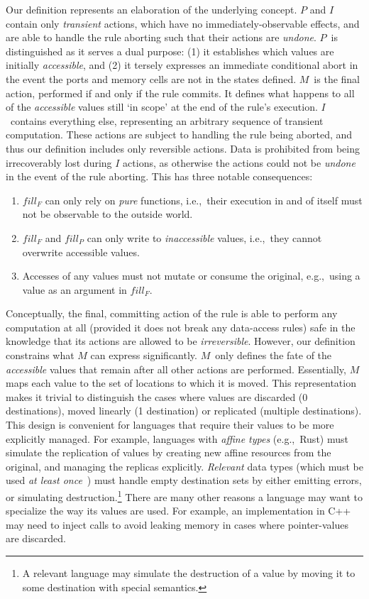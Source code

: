 Our definition represents an elaboration of the underlying concept. $P$ and $I$ contain only \textit{transient} actions, which have no immediately-observable effects, and are able to handle the rule aborting such that their actions are \textit{undone}. $P$~is distinguished as it serves a dual purpose: (1) it establishes which values are initially \textit{accessible}, and (2) it tersely expresses an immediate conditional abort in the event the ports and memory cells are not in the states defined. $M$~is the final action, performed if and only if the rule commits. It defines what happens to all of the \textit{accessible} values still `in scope' at the end of the rule's execution. $I$~contains everything else, representing an arbitrary sequence of transient computation. These actions are subject to handling the rule being aborted, and thus our definition includes only reversible actions. Data is prohibited from being irrecoverably lost during $I$ actions, as otherwise the actions could not be \textit{undone} in the event of the rule aborting. This has three notable consequences:
\begin{enumerate}
	\item $fill_F$ can only rely on \textit{pure} functions, i.e.,\ their execution in and of itself must not be observable to the outside world.
	\item $fill_F$ and $fill_P$ can only write to \textit{inaccessible} values, i.e.,\ they cannot overwrite accessible values.
	\item Accesses of any values must not mutate or consume the original, e.g.,\ using a value as an argument in $fill_F$.
\end{enumerate}

Conceptually, the final, committing action of the rule is able to perform any computation at all (provided it does not break any data-access rules) safe in the knowledge that its actions are allowed to be \textit{irreversible}. However, our definition constrains what $M$ can express significantly. $M$~only defines the fate of the \textit{accessible} values that remain after all other actions are performed. Essentially, $M$ maps each value to the set of locations to which it is moved. This representation makes it trivial to distinguish the cases where values are discarded (0 destinations), moved linearly (1 destination) or replicated (multiple destinations). This design is convenient for languages that require their values to be more explicitly managed. For example, languages with \textit{affine types} (e.g.,\ Rust) must simulate the replication of values by creating new affine resources from the original, and managing the replicas explicitly.  \textit{Relevant} data types (which must be used \textit{at least once}~\cite{walker2005substructural}) must handle empty destination sets by either emitting errors, or simulating destruction.\footnote{A relevant language may simulate the destruction of a value by moving it to some  destination with special semantics.} There are many other reasons a language may want to specialize the way its values are used. For example, an implementation in C++ may need to inject  calls to avoid leaking memory in cases where pointer-values are discarded.

